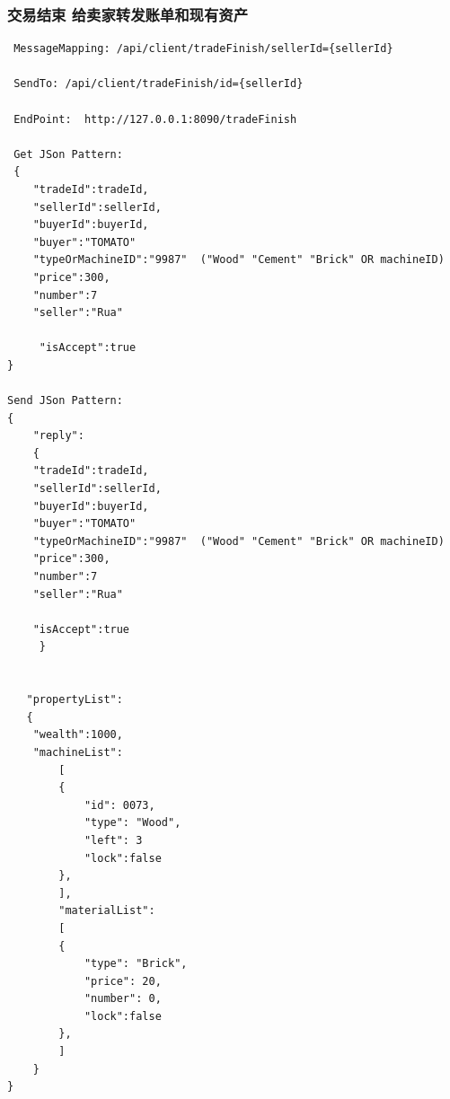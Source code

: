 \documentclass[12pt, a4paper,UTF8]{article}
\begin{document}
				\subsubsection{交易结束 给卖家转发账单和现有资产}
\begin{lstlisting}
 MessageMapping: /api/client/tradeFinish/sellerId={sellerId}

 SendTo: /api/client/tradeFinish/id={sellerId}
 
 EndPoint:  http://127.0.0.1:8090/tradeFinish
 
 Get JSon Pattern:
 {
    "tradeId":tradeId,
    "sellerId":sellerId,
    "buyerId":buyerId,
    "buyer":"TOMATO"
    "typeOrMachineID":"9987"  ("Wood" "Cement" "Brick" OR machineID)
    "price":300,
    "number":7
    "seller":"Rua"
     
     "isAccept":true
}
 
Send JSon Pattern:
{
    "reply":
    {
    "tradeId":tradeId,
    "sellerId":sellerId,
    "buyerId":buyerId,
    "buyer":"TOMATO"
    "typeOrMachineID":"9987"  ("Wood" "Cement" "Brick" OR machineID)
    "price":300,
    "number":7
    "seller":"Rua"
    
    "isAccept":true
     }
     
   
   "propertyList":
   {
   	"wealth":1000,
   	"machineList":
    	[
        {
            "id": 0073,
            "type": "Wood",
            "left": 3
            "lock":false
        },
        ],
    	"materialList":
    	[
        {
            "type": "Brick",
            "price": 20,
            "number": 0,
            "lock":false
        },
    	]
    }
}
\end{lstlisting}
\end{document}
